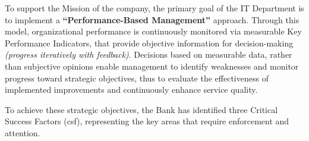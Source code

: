 To support the Mission of the company, the primary goal of the IT Department is to implement a \textbf{``Performance-Based Management''} approach. Through this model, organizational performance is continuously monitored via measurable Key Performance Indicators, that provide objective information for decision-making \textit{(progress iteratively with feedback)}. Decisions based on measurable data, rather than subjective opinions enable management to identify weaknesses and monitor progress toward strategic objectives, thus to evaluate the effectiveness of implemented improvements and continuously enhance service quality.

To achieve these strategic objectives, the Bank has identified three Critical Success Factors (\gls{csf}), representing the key areas that require enforcement and attention.

